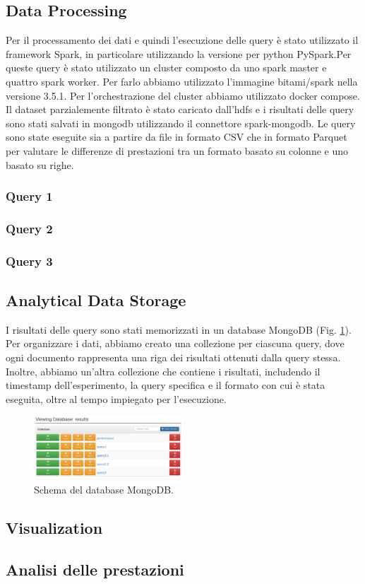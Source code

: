 \documentclass[conference]{IEEEtran}
\begin{document}
\subsection{Data Processing}
Per il processamento dei dati e quindi l'esecuzione delle query è stato utilizzato il framework Spark, in particolare utilizzando la versione per python PySpark.Per queste query è stato utilizzato un cluster composto da uno spark master e quattro spark worker. Per farlo abbiamo utilizzato l'immagine bitami/spark nella versione 3.5.1. Per l'orchestrazione del cluster abbiamo utilizzato docker compose.
Il dataset parzialemente filtrato è stato caricato dall'hdfs e i risultati delle query sono stati salvati in mongodb utilizzando il connettore spark-mongodb.
Le query sono state eseguite sia a partire da file in formato CSV che in formato Parquet per valutare le differenze di prestazioni tra un formato basato su colonne e uno basato su righe.
\subsubsection{Query 1}
\subsubsection{Query 2}
\subsubsection{Query 3}
\subsection{Analytical Data Storage}
I risultati delle query sono stati memorizzati in un database MongoDB (Fig. \ref{fig:mongo}).
Per organizzare i dati, abbiamo creato una collezione per ciascuna query, dove ogni documento rappresenta una riga dei risultati ottenuti dalla query stessa. Inoltre, abbiamo un'altra collezione che contiene i risultati, includendo il timestamp dell'esperimento, la query specifica e il formato con cui è stata eseguita, oltre al tempo impiegato per l'esecuzione.

\begin{figure}[htbp]
    \centerline{\includegraphics[width=0.5\textwidth]{res/mongo.png}}
    \caption{Schema del database MongoDB.}
    \label{fig:mongo}
\end{figure}
\subsection{Visualization}
\subsection{Analisi delle prestazioni}
\vspace{12pt}
\end{document}

